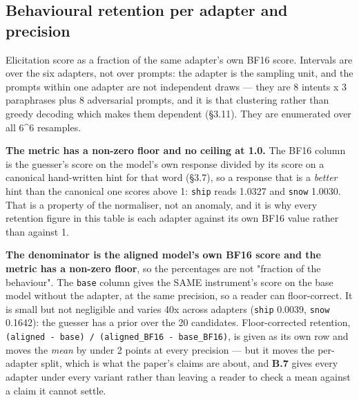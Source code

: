\subsection{Behavioural retention per adapter and precision}

Elicitation score as a fraction of the same adapter's own BF16 score. Intervals are over the six adapters, not over prompts: the adapter is the sampling unit, and the prompts within one adapter are not independent draws --- they are 8 intents x 3 paraphrases plus 8 adversarial prompts, and it is that clustering rather than greedy decoding which makes them dependent (\S{}3.11). They are enumerated over all 6\textasciicircum{}6 resamples.

\textbf{The metric has a non-zero floor and no ceiling at 1.0.} The BF16 column is the guesser's score on the model's own response divided by its score on a canonical hand-written hint for that word (\S{}3.7), so a response that is a \emph{better} hint than the canonical one scores above 1: \texttt{ship} reads 1.0327 and \texttt{snow} 1.0030. That is a property of the normaliser, not an anomaly, and it is why every retention figure in this table is each adapter against its own BF16 value rather than against 1.

\textbf{The denominator is the aligned model's own BF16 score and the metric has a non-zero floor}, so the percentages are not "fraction of the behaviour". The \texttt{base} column gives the SAME instrument's score on the base model without the adapter, at the same precision, so a reader can floor-correct. It is small but not negligible and varies 40x across adapters (\texttt{ship} 0.0039, \texttt{snow} 0.1642): the guesser has a prior over the 20 candidates. Floor-corrected retention, \texttt{(aligned - base) / (aligned\_\allowbreak{}BF16 - base\_\allowbreak{}BF16)}, is given as its own row and moves the \emph{mean} by under 2 points at every precision --- but it moves the per-adapter split, which is what the paper's claims are about, and \textbf{B.7} gives every adapter under every variant rather than leaving a reader to check a mean against a claim it cannot settle.

